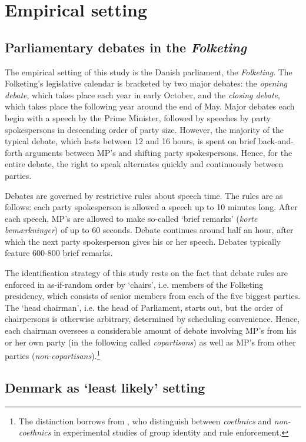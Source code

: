 \documentclass[12pt,a4paper]{article}
\begin{document}
\section{Empirical setting}\label{emp}

\subsection{Parliamentary debates in the \textit{Folketing}}
The empirical setting of this study is the Danish parliament, the \textit{Folketing}. The Folketing's legislative calendar is bracketed by two major debates: the \textit{opening debate}, which takes place each year in early October, and the \textit{closing debate}, which takes place the following year around the end of May. Major debates each begin with a speech by the Prime Minister, followed by speeches by party spokespersons in descending order of party size. However, the majority of the typical debate, which lasts between 12 and 16 hours, is spent on brief back-and-forth arguments between MP's and shifting party spokespersons. Hence, for the entire debate, the right to speak alternates quickly and continuously between parties. 

Debates are governed by restrictive rules about speech time. The rules are as follows: each party spokesperson is allowed a speech up to 10 minutes long. After each speech, MP's are allowed to make so-called `brief remarks' (\textit{korte bemærkninger}) of up to 60 seconds. Debate continues around half an hour, after which the next party spokesperson gives his or her speech. Debates typically feature 600-800 brief remarks. 

The identification strategy of this study rests on the fact that debate rules are enforced in as-if-random order by `chairs', i.e. members of the Folketing presidency, which consists of senior members from each of the five biggest parties. The `head chairman', i.e. the head of Parliament, starts out, but the order of chairpersons is otherwise arbitrary, determined by scheduling convenience. Hence, each chairman oversees a considerable amount of debate involving MP's from his or her own party (in the following called \textit{copartisans}) as well as MP's from other parties (\textit{non-copartisans}).\footnote{The distinction borrows from \cite{Habyarimana2007}, who distinguish between \textit{coethnics} and \textit{non-coethnics} in experimental studies of group identity and rule enforcement.} 

\subsection{Denmark as `least likely' setting}
\end{document}
